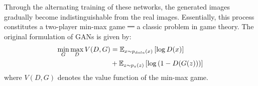 \documentclass[fleqn,usenatbib,twocolumn]{mnras}
\makeatletter
\providecommand{\DIFadd}[1]{{\protect\color{blue}\uwave{#1}}} %
\providecommand{\DIFdel}[1]{{\protect\color{red}\sout{#1}}} %
\providecommand{\DIFaddbegin}{} %
\providecommand{\DIFaddend}{} %
\providecommand{\DIFdelbegin}{} %
\providecommand{\DIFdelend}{} %
\newcommand{\DIFscaledelfig}{0.5}
\newlength{\DIFdelgraphicswidth} %
\newlength{\DIFdelgraphicsheight} %
\newcommand{\DIFaddincludegraphics}[2][]{{\color{blue}\fbox{\DIFOincludegraphics[#1]{#2}}}} %
\newcommand{\DIFdelincludegraphics}[2][]{%
\sbox{\DIFdelgraphicsbox}{\DIFOincludegraphics[#1]{#2}}%
\settoboxwidth{\DIFdelgraphicswidth}{\DIFdelgraphicsbox} %
\settoboxtotalheight{\DIFdelgraphicsheight}{\DIFdelgraphicsbox} %
\scalebox{\DIFscaledelfig}{%
\parbox[b]{\DIFdelgraphicswidth}{\usebox{\DIFdelgraphicsbox}\\[-\baselineskip] \rule{\DIFdelgraphicswidth}{0em}}\llap{\resizebox{\DIFdelgraphicswidth}{\DIFdelgraphicsheight}{%
\setlength{\unitlength}{\DIFdelgraphicswidth}%
\begin{picture}(1,1)%
\thicklines\linethickness{2pt} %
{\color[rgb]{1,0,0}\put(0,0){\framebox(1,1){}}}%
{\color[rgb]{1,0,0}\put(0,0){\line( 1,1){1}}}%
{\color[rgb]{1,0,0}\put(0,1){\line(1,-1){1}}}%
\end{picture}%
}\hspace*{3pt}}} %
} %
\DeclareRobustCommand{\DIFaddbegin}{\DIFOaddbegin \let\includegraphics\DIFaddincludegraphics} %
\DeclareRobustCommand{\DIFaddend}{\DIFOaddend \let\includegraphics\DIFOincludegraphics} %
\DeclareRobustCommand{\DIFdelbegin}{\DIFOdelbegin \let\includegraphics\DIFdelincludegraphics} %
\DeclareRobustCommand{\DIFdelend}{\DIFOaddend \let\includegraphics\DIFOincludegraphics} %
\let\sout@orig\sout %
\renewcommand{\sout}[1]{\ifmmode\text{\sout@orig{\ensuremath{#1}}}\else\sout@orig{#1}\fi} %
\makeatother
\begin{document}
Through the alternating training of these networks, the generated images gradually become indistinguishable from the real images. Essentially, this process constitutes a two-player min-max game \DIFdelbegin \DIFdel{— }\DIFdelend \DIFaddbegin \DIFadd{--- }\DIFaddend a classic problem in game theory. The original formulation of GANs is given by:
\begin{equation}
	\centering
	\begin{aligned}
		\min_{G} \max_{D} V(D, G) &= \mathbb{E}_{x \sim p_{data}(x)} \left[ \log D(x) \right] \\
		&+ \mathbb{E}_{z \sim p_{z}(z)} \left[ \log \left( 1-D(G(z)) \right) \right]
	\end{aligned}
	\label{eq:Basic_GAN}
\end{equation}
where $V(D, G)$ denotes the value function of the min-max game.
\end{document}
